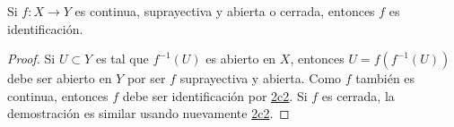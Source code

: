

\begin{proposition}
Si $f : X \longrightarrow Y$ es continua, suprayectiva y abierta o cerrada, entonces $f$ es identificación.
\end{proposition}

\begin{proof}
Si $U \subset Y$ es tal que $f^{-1}(U)$ es abierto en $X$, entonces $U = f(f^{-1}(U))$ debe ser abierto en $Y$ por ser $f$ suprayectiva y abierta. Como $f$ también es continua, entonces $f$ debe ser identificación por \hyperref[card:2c2]{\textsf{2c2}}. Si $f$ es cerrada, la demostración es similar usando nuevamente \hyperref[card:2c2]{\textsf{2c2}}.

\end{proof}

